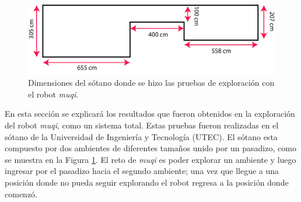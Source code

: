 \begin{figure}
  \centering \footnotesize
  \includegraphics[width=1.0\textwidth]{images/medidas_mapa.jpg}
  \captionsetup{font=footnotesize}
  \caption{Dimensiones del sótano donde se hizo las pruebas de exploración con 
  el robot \textit{muqi}.}
  \label{fig:DimensionesSotano}
\end{figure}

En esta sección se explicará los resultados que fueron obtenidos en la exploración 
del robot \textit{muqi}, como un sistema total. Estas pruebas fueron realizadas en
el sótano de la Universidad de Ingeniería y Tecnología (UTEC). El sótano esta 
compuesto por dos ambientes de diferentes tamaños unido por un pasadizo, como se 
muestra en la Figura \ref{fig:DimensionesSotano}. El reto de \textit{muqi} es poder 
explorar un ambiente y luego ingresar por el pasadizo hacia el segundo ambiente; una 
vez que llegue a una posición donde no pueda seguir explorando el robot regresa a la 
posición donde comenzó.




